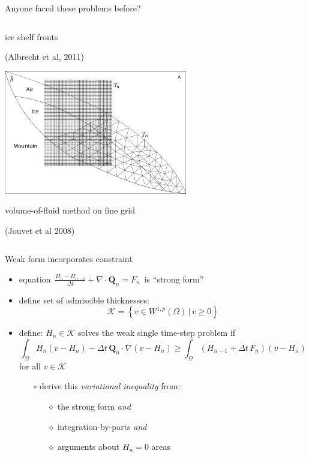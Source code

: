 \documentclass{beamer}
\newcommand\bQ{\mathbf{Q}}
\newcommand{\Div}{\nabla\cdot}
\newcommand{\grad}{\nabla}
\begin{document}
\begin{frame}{Anyone faced these problems before?}
{\begin{columns}
\begin{column}{0.6\textwidth}
\small ice shelf fronts

\tiny (Albrecht et al, 2011)

\small \medskip
\includegraphics[width=0.6\textwidth,keepaspectratio=true]{jouvet-two-grids}

\small volume-of-fluid method on fine grid

\tiny (Jouvet et al 2008)
\end{column}
\end{columns}}

\end{frame}


\begin{frame}{Weak form incorporates constraint}

  \begin{itemize}
  \item equation \,$\frac{H_n - H_{n-1}}{\Delta t} + \Div \bQ_n = F_n$\, is ``strong form''
  \item define set of admissible thicknesses:
    $$\mathcal{K} = \left\{v \in W^{1,p}(\Omega) \,\Big|\, v\ge 0\right\}$$
  \item define: $H_n \in \mathcal{K}$ solves the \alert{weak single time-step problem} if
    $$\int_\Omega H_n (v - H_n) - \Delta t\, \bQ_n \cdot \grad(v - H_n) \ge \int_\Omega \left(H_{n-1} + \Delta t\, F_n\right) (v - H_n)$$
  for all $v \in \mathcal{K}$
  \small
  \medskip
    \begin{itemize}
    \item[$\circ$] derive this \emph{variational inequality} from:
      \begin{itemize}
      \item[$\diamond$] the strong form \emph{and}
      \item[$\diamond$] integration-by-parts \emph{and}
      \item[$\diamond$] arguments about $H_n=0$ areas
      \end{itemize}
    \end{itemize}
  \end{itemize}
\end{frame}
\end{document}
